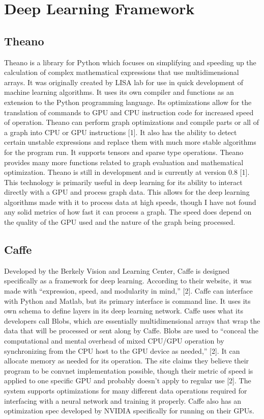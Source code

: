 \documentclass{scrreprt}
\begin{document}
\section{Deep Learning Framework}

\subsection{Theano}
Theano is a library for Python which focuses on simplifying and speeding up the calculation of complex mathematical expressions that use multidimensional arrays. 
It was originally created by LISA lab for use in quick development of machine learning algorithms.
It uses its own compiler and functions as an extension to the Python programming language. 
Its optimizations allow for the translation of commands to GPU and CPU instruction code for increased speed of operation.
Theano can perform graph optimizations and compile parts or all of a graph into CPU or GPU instructions [1]. 
It also has the ability to detect certain unstable expressions and replace them with much more stable algorithms for the program run.
It supports tensors and sparse type operations. 
Theano provides many more functions related to graph evaluation and mathematical optimization. 
Theano is still in development and is currently at version 0.8 [1]. 
This technology is primarily useful in deep learning for its ability to interact directly with a GPU and process graph data. 
This allows for the deep learning algorithms made with it to process data at high speeds, though I have not found any solid metrics of how fast it can process a graph. 
The speed does depend on the quality of the GPU used and the nature of the graph being processed.

\subsection{Caffe}
Developed by the Berkely Vision and Learning Center, Caffe is designed specifically as a framework for deep learning. 
According to their website, it was made with “expression, speed, and modularity in mind,” [2]. 
Caffe can interface with Python and Matlab, but its primary interface is command line. 
It uses its own schema to define layers in its deep learning network.
Caffe uses what its developers call Blobs, which are essentially multidimensional arrays that wrap the data that will be processed or sent along by Caffe. 
Blobs are used to “conceal the computational and mental overhead of mixed CPU/GPU operation by synchronizing from the CPU host to the GPU device as needed,” [2]. 
It can allocate memory as needed for its operation.
The site claims they believe their program to be convnet implementation possible, though their metric of speed is applied to one specific GPU and probably doesn't apply to regular use [2]. 
The system supports optimizations for many different data operations required for interfacing with a neural network and training it properly.
Caffe also has an optimization spec developed by NVIDIA specifically for running on their GPUs.
\end{document}
